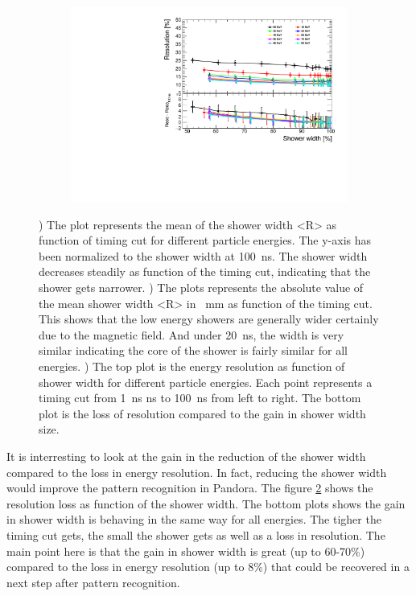 \begin{figure}[htbp!]
  \begin{minipage}{.45\textwidth}
    \centering
    \begin{subfigure}[t]{1\textwidth}
      \centering
      \includegraphics[width=1\linewidth]{chap6/fig_TimingILD/NoSmearing/ShowerWidth_Resolution_noSmearing}
      \vspace{-6ex}
      \caption{}  \label{fig:ShowerWidthResoNoSmearing}
    \end{subfigure}
  \end{minipage}
  \caption{) The plot represents the mean of the shower width <R> as function of timing cut for different particle energies. The y-axis has been normalized to the shower width at \SI{100}{\nano\second}. The shower width decreases steadily as function of the timing cut, indicating that the shower gets narrower. ) The plots represents the absolute value of the mean shower width <R> in \SI{}{\milli\meter} as function of the timing cut. This shows that the low energy showers are generally wider certainly due to the magnetic field. And under \SI{20}{\nano\second}, the width is very similar indicating the core of the shower is fairly similar for all energies. ) The top plot is the energy resolution as function of shower width for different particle energies. Each point represents a timing cut from \SI{1}{\nano\second} ns to \SI{100}{\nano\second} from left to right. The bottom plot is the loss of resolution compared to the gain in shower width size.}
\end{figure}

It is interresting to look at the gain in the reduction of the shower width compared to the loss in energy resolution. In fact, reducing the shower width would improve the pattern recognition in Pandora. The figure \ref{fig:ShowerWidthResoNoSmearing} shows the resolution loss as function of the shower width. The bottom plots shows the gain in shower width is behaving in the same way for all energies. The tigher the timing cut gets, the small the shower gets as well as a loss in resolution. The main point here is that the gain in shower width is great (up to 60-70\%) compared to the loss in energy resolution (up to 8\%) that could be recovered in a next step after pattern recognition.

